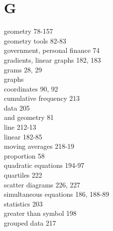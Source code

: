 \documentclass[10pt]{article}
\begin{document}
\section*{G}
geometry 78-157\\
geometry tools 82-83\\
government, personal finance 74\\
gradients, linear graphs 182, 183\\
grams 28, 29\\
graphs\\
coordinates 90, 92\\
cumulative frequency 213\\
data 205\\
and geometry 81\\
line 212-13\\
linear 182-85\\
moving averages 218-19\\
proportion 58\\
quadratic equations 194-97\\
quartiles 222\\
scatter diagrams 226, 227\\
simultaneous equations 186, 188-89\\
statistics 203\\
greater than symbol 198\\
grouped data 217
\end{document}

